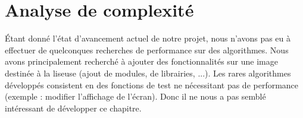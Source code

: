 \chapter{Analyse de complexité}

Étant donné l'état d'avancement actuel de notre projet, nous n'avons pas eu à effectuer de quelconques recherches de performance sur des algorithmes. Nous avons principalement recherché à ajouter des fonctionnalités sur une image destinée à la liseuse (ajout de modules, de librairies, ...). Les rares algorithmes développés consistent en des fonctions de test ne nécessitant pas de performance (exemple : modifier l'affichage de l'écran). Donc il ne nous a pas semblé intéressant de développer ce chapitre.